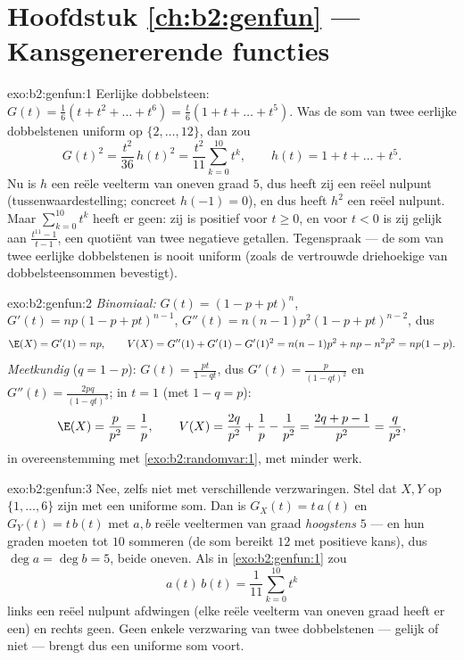 \section*{Hoofdstuk \ref{ch:b2:genfun} --- Kansgenererende functies}

\begin{solution}{exo:b2:genfun:1}
Eerlijke dobbelsteen: $G(t) = \frac16(t + t^2 + \dots + t^6) =
\frac t6(1 + t + \dots + t^5)$. Was de som van twee eerlijke
dobbelstenen uniform op $\{2, \dots, 12\}$, dan zou
\[
G(t)^2 = \frac{t^2}{36}\,h(t)^2
= \frac{t^2}{11}\sum_{k=0}^{10}t^k ,
\qquad h(t) = 1 + t + \dots + t^5 .
\]
Nu is $h$ een reële veelterm van oneven graad $5$, dus heeft zij
een reëel nulpunt (tussenwaardestelling; concreet $h(-1) = 0$), en
dus heeft $h^2$ een reëel nulpunt. Maar $\sum_{k=0}^{10}t^k$ heeft
er geen: zij is positief voor $t \geq 0$, en voor $t < 0$ is zij
gelijk aan $\frac{t^{11} - 1}{t - 1}$, een quotiënt van twee
negatieve getallen. Tegenspraak --- de som van twee eerlijke
dobbelstenen is nooit uniform (zoals de vertrouwde driehoekige
 van dobbelsteensommen bevestigt).
\end{solution}

\begin{solution}{exo:b2:genfun:2}
\emph{Binomiaal:} $G(t) = (1 - p + pt)^n$, $G'(t) = np(1 - p +
pt)^{n-1}$, $G''(t) = n(n-1)p^2(1 - p + pt)^{n-2}$, dus
\[
\E(X) = G'(1) = np,
\qquad
V(X) = G''(1) + G'(1) - G'(1)^2
= n(n-1)p^2 + np - n^2p^2 = np(1-p).
\]
\emph{Meetkundig} ($q = 1 - p$): $G(t) = \frac{pt}{1 - qt}$, dus
$G'(t) = \frac{p}{(1 - qt)^2}$ en $G''(t) = \frac{2pq}{(1 -
qt)^3}$; in $t = 1$ (met $1 - q = p$):
\[
\E(X) = \frac{p}{p^2} = \frac1p,
\qquad
V(X) = \frac{2q}{p^2} + \frac1p - \frac{1}{p^2}
= \frac{2q + p - 1}{p^2}
= \frac{q}{p^2} ,
\]
in overeenstemming met \cref{exo:b2:randomvar:1}, met minder werk.
\end{solution}

\begin{solution}{exo:b2:genfun:3}
Nee, zelfs niet met verschillende verzwaringen. Stel dat $X, Y$
 op $\{1, \dots, 6\}$ zijn met een uniforme som. Dan is
$G_X(t) = t\,a(t)$ en $G_Y(t) = t\,b(t)$ met $a, b$ reële
veeltermen van graad \emph{hoogstens} $5$ --- en hun graden moeten
tot $10$ sommeren (de som bereikt $12$ met positieve kans), dus
$\deg a = \deg b = 5$, beide oneven. Als in
\cref{exo:b2:genfun:1} zou
\[
a(t)\,b(t) = \frac{1}{11}\sum_{k=0}^{10}t^k
\]
links een reëel nulpunt afdwingen (elke reële veelterm van oneven
graad heeft er een) en rechts geen. Geen enkele verzwaring van twee
 dobbelstenen --- gelijk of niet --- brengt dus een
uniforme som voort.
\end{solution}

